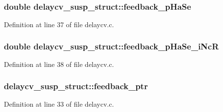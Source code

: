 \subsubsection[{\texorpdfstring{feedback\+\_\+p\+Ha\+Se}{feedback_pHaSe}}]{\setlength{\rightskip}{0pt plus 5cm}double delaycv\+\_\+susp\+\_\+struct\+::feedback\+\_\+p\+Ha\+Se}\hypertarget{structdelaycv__susp__struct_abfeff69c5f93de04040bd22f812222ef}{}\label{structdelaycv__susp__struct_abfeff69c5f93de04040bd22f812222ef}


Definition at line 37 of file delaycv.\+c.

\subsubsection[{\texorpdfstring{feedback\+\_\+p\+Ha\+Se\+\_\+i\+NcR}{feedback_pHaSe_iNcR}}]{\setlength{\rightskip}{0pt plus 5cm}double delaycv\+\_\+susp\+\_\+struct\+::feedback\+\_\+p\+Ha\+Se\+\_\+i\+NcR}\hypertarget{structdelaycv__susp__struct_a1fbfd4ed465ec8387fd377c638d386db}{}\label{structdelaycv__susp__struct_a1fbfd4ed465ec8387fd377c638d386db}


Definition at line 38 of file delaycv.\+c.

\subsubsection[{\texorpdfstring{feedback\+\_\+ptr}{feedback_ptr}}]{ delaycv\+\_\+susp\+\_\+struct\+::feedback\+\_\+ptr}\hypertarget{structdelaycv__susp__struct_a27355b28ad80523e127686c1a5628362}{}\label{structdelaycv__susp__struct_a27355b28ad80523e127686c1a5628362}


Definition at line 33 of file delaycv.\+c.

